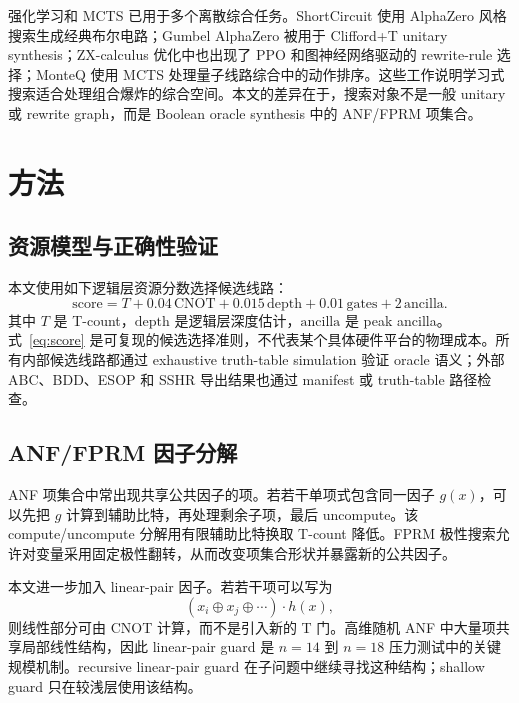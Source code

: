 \documentclass[UTF8,fontset=macnew,11pt]{ctexart}
\newcommand{\score}{\mathrm{score}}
\begin{document}
强化学习和 MCTS 已用于多个离散综合任务。ShortCircuit 使用 AlphaZero 风格搜索生成经典布尔电路\cite{tsaras2024shortcircuit}；Gumbel AlphaZero 被用于 Clifford+T unitary synthesis\cite{rietsch2024unitary}；ZX-calculus 优化中也出现了 PPO 和图神经网络驱动的 rewrite-rule 选择\cite{riu2025zx}；MonteQ 使用 MCTS 处理量子线路综合中的动作排序\cite{machiya2026monteq}。这些工作说明学习式搜索适合处理组合爆炸的综合空间。本文的差异在于，搜索对象不是一般 unitary 或 rewrite graph，而是 Boolean oracle synthesis 中的 ANF/FPRM 项集合。

\section{方法}

\subsection{资源模型与正确性验证}

本文使用如下逻辑层资源分数选择候选线路：
\begin{equation}
  \score = T + 0.04\,\mathrm{CNOT} + 0.015\,\mathrm{depth}
         + 0.01\,\mathrm{gates} + 2\,\mathrm{ancilla}.
  \label{eq:score}
\end{equation}
其中 $T$ 是 T-count，$\mathrm{depth}$ 是逻辑层深度估计，$\mathrm{ancilla}$ 是 peak ancilla。式~\eqref{eq:score} 是可复现的候选选择准则，不代表某个具体硬件平台的物理成本。所有内部候选线路都通过 exhaustive truth-table simulation 验证 oracle 语义；外部 ABC、BDD、ESOP 和 SSHR 导出结果也通过 manifest 或 truth-table 路径检查。

\subsection{ANF/FPRM 因子分解}

ANF 项集合中常出现共享公共因子的项。若若干单项式包含同一因子 $g(x)$，可以先把 $g$ 计算到辅助比特，再处理剩余子项，最后 uncompute。该 compute/uncompute 分解用有限辅助比特换取 T-count 降低。FPRM 极性搜索允许对变量采用固定极性翻转，从而改变项集合形状并暴露新的公共因子。

本文进一步加入 linear-pair 因子。若若干项可以写为
\begin{equation}
  (x_i \oplus x_j \oplus \cdots)\cdot h(x),
\end{equation}
则线性部分可由 CNOT 计算，而不是引入新的 T 门。高维随机 ANF 中大量项共享局部线性结构，因此 linear-pair guard 是 $n=14$ 到 $n=18$ 压力测试中的关键规模机制。recursive linear-pair guard 在子问题中继续寻找这种结构；shallow guard 只在较浅层使用该结构。
\end{document}

